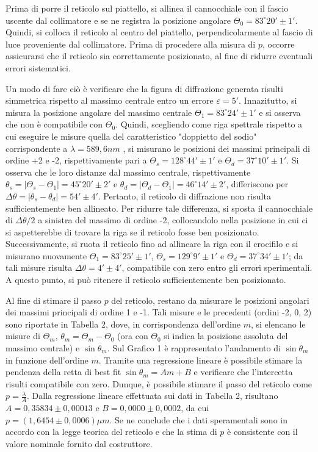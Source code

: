 \documentclass{article}
\begin{document}
Prima di porre il reticolo sul piattello, si allinea il cannocchiale con il fascio uscente dal collimatore e se ne registra la posizione angolare $\Theta_0=83^{\circ}20'\pm1'$. Quindi, si colloca il reticolo al centro del piattello, perpendicolarmente al fascio di luce proveniente dal collimatore. Prima di procedere alla misura di $p$, occorre assicurarsi che il reticolo sia correttamente posizionato, al fine di ridurre eventuali errori sistematici.
 
Un modo di fare ciò è verificare che la figura di diffrazione generata risulti simmetrica rispetto al massimo centrale entro un errore $\varepsilon = 5'$. Innazitutto, si misura la posizione angolare del massimo centrale $\Theta_1 = 83^\circ 24' \pm 1'$ e si osserva che non è compatibile con $\Theta_0$.
Quindi, scegliendo come riga spettrale rispetto a cui eseguire le misure quella del caratteristico "doppietto del sodio" corrispondente a $\lambda=589,6nm$ , si misurano le posizioni dei massimi principali di ordine +2  e -2, rispettivamente pari a $\Theta_s = 128^\circ 44' \pm 1'$
e $\Theta_d = 37^\circ 10' \pm 1'$. Si osserva che le loro distanze dal massimo centrale, rispettivamente $\theta_s = |\Theta_s - \Theta_1| = 45^\circ20' \pm 2'$ e $\theta_d = |\Theta_d - \Theta_1| = 46^\circ 14' \pm 2'$, differiscono per $\Delta\theta = |\theta_s - \theta_d| = 54' \pm 4'$. Pertanto, il reticolo di diffrazione non risulta sufficientemente ben allineato. Per ridurre tale differenza, si sposta il cannocchiale di $\Delta\theta/2$ a sinistra del massimo di ordine -2, collocandolo nella posizione in cui ci si
aspetterebbe di trovare la riga se il reticolo fosse ben posizionato. Successivamente, si ruota il reticolo fino ad allineare la riga con il crocifilo e si misurano nuovamente $\Theta_1 = 83^\circ 25' \pm 1'$, $\Theta_s = 129^\circ 9' \pm 1'$ e $\Theta_d = 37^\circ 34' \pm 1'$; da tali misure risulta $\Delta\theta
= 4' \pm 4'$, compatibile con zero entro gli errori sperimentali. A questo punto, si può ritenere il reticolo sufficientemente ben posizionato.

Al fine di stimare il passo $p$ del reticolo, restano da misurare le posizioni angolari dei massimi principali di ordine 1 e -1.
Tali misure e le precedenti (ordini -2, 0, 2) sono riportate in Tabella 2, dove, in corrispondenza dell'ordine $m$, si elencano le misure di $\Theta_m$, $\theta_m = \Theta_m - \Theta_0$ (ora con $\Theta_0$ si indica la posizione assoluta del massimo centrale) e $\sin \theta_m$.
Sul Grafico 1 è rappresentato l'andamento di $\sin \theta_m$ in funzione dell'ordine $m$. Tramite una regressione lineare è possibile stimare la pendenza della retta di best fit $\sin \theta_m = Am + B$ e verificare che l'intercetta risulti compatibile con zero. Dunque, è possibile stimare il passo del reticolo come $p=\frac{\lambda}{A}$.
Dalla regressione lineare effettuata sui dati in Tabella 2, risultano $A=0,35834\pm0,00013$ e $B=0,0000\pm0,0002$, da cui $p=(1,6454\pm0,0006)\mu m$. Se ne conclude che i dati speramentali sono in accordo con la legge teorica del reticolo e che la stima di $p$ è consistente con il valore nominale fornito dal costruttore.
\end{document}
